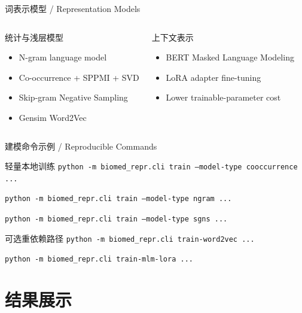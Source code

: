 \documentclass[aspectratio=169,10pt]{ctexbeamer}
\begin{document}
\begin{frame}{词表示模型 / Representation Models}
  \begin{columns}[T]
    \begin{block}{统计与浅层模型}
      \begin{itemize}
        \item N-gram language model
        \item Co-occurrence + SPPMI + SVD
        \item Skip-gram Negative Sampling
        \item Gensim Word2Vec
      \end{itemize}
    \end{block}
    \begin{block}{上下文表示}
      \begin{itemize}
        \item BERT Masked Language Modeling
        \item LoRA adapter fine-tuning
        \item Lower trainable-parameter cost
      \end{itemize}
    \end{block}
  \end{columns}
\end{frame}

\begin{frame}{建模命令示例 / Reproducible Commands}
  \small
  \begin{block}{轻量本地训练}
    \texttt{python -m biomed\_repr.cli train --model-type cooccurrence ...}

    \texttt{python -m biomed\_repr.cli train --model-type ngram ...}

    \texttt{python -m biomed\_repr.cli train --model-type sgns ...}
  \end{block}
  \begin{block}{可选重依赖路径}
    \texttt{python -m biomed\_repr.cli train-word2vec ...}

    \texttt{python -m biomed\_repr.cli train-mlm-lora ...}
  \end{block}
\end{frame}

\section{结果展示}
\end{document}
